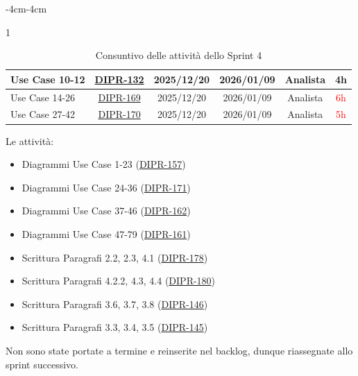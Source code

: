 \documentclass[a4paper,12pt]{article}
\begin{document}
\begin{table}[H]
\begin{adjustwidth}{-4cm}{-4cm}
\begin{spacing}{1}
\begin{tabular}{|p{4cm}|c|c|c|c|c|}
            \hline
            Use Case 10-12 & \href{https://7zpus.atlassian.net/browse/DIPR-132}{DIPR-132} & 2025/12/20 & 2026/01/09 & Analista & \textcolor{green!50!black}{4h}\\
            \hline       
            Use Case 14-26& \href{https://7zpus.atlassian.net/browse/DIPR-169}{DIPR-169} & 2025/12/20 & 2026/01/09 & Analista & \textcolor{red}{6h} \\
            \hline
            Use Case 27-42& \href{https://7zpus.atlassian.net/browse/DIPR-170}{DIPR-170} & 2025/12/20 & 2026/01/09 & Analista & \textcolor{red}{5h} \\
            \hline
        \end{tabular}
    \end{spacing}
    \caption{Consuntivo delle attività dello Sprint 4}
    \end{adjustwidth}
\end{table}

Le attività:
    \begin{itemize}
        \item Diagrammi Use Case 1-23 (\href{https://7zpus.atlassian.net/browse/DIPR-157}{DIPR-157})
        \item Diagrammi Use Case 24-36 (\href{https://7zpus.atlassian.net/browse/DIPR-171}{DIPR-171})
        \item Diagrammi Use Case 37-46 (\href{https://7zpus.atlassian.net/browse/DIPR-162}{DIPR-162})
        \item Diagrammi Use Case 47-79 (\href{https://7zpus.atlassian.net/browse/DIPR-161}{DIPR-161})
        \item Scrittura Paragrafi 2.2, 2.3, 4.1 (\href{https://7zpus.atlassian.net/browse/DIPR-178}{DIPR-178})
        \item Scrittura Paragrafi 4.2.2, 4.3, 4.4 (\href{https://7zpus.atlassian.net/browse/DIPR-180}{DIPR-180})
        \item Scrittura Paragrafi 3.6, 3.7, 3.8 (\href{https://7zpus.atlassian.net/browse/DIPR-146}{DIPR-146})
        \item Scrittura Paragrafi 3.3, 3.4, 3.5 (\href{https://7zpus.atlassian.net/browse/DIPR-145}{DIPR-145})
    \end{itemize}
    Non sono state portate a termine e reinserite nel backlog, dunque riassegnate allo sprint successivo.\\
\end{document}
